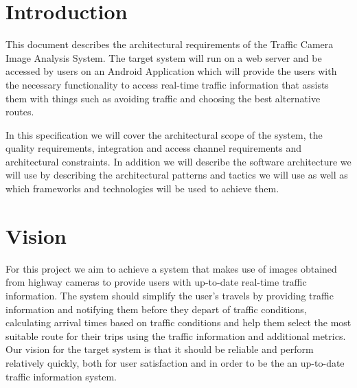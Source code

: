 \documentclass[a4paper,12pt]{article}
\begin{document}
\newpage
\tableofcontents
\newpage

\newpage

\newpage
\section{Introduction}
This document describes the architectural requirements of the Traffic Camera Image Analysis System. The target system will run on a web server  and be accessed by users on an Android Application which will provide the users with the necessary functionality to access real-time traffic information that assists them with things such as avoiding traffic and choosing the best alternative routes.

In this specification we will cover the architectural scope of the system, the quality requirements, integration and access channel requirements and architectural constraints. In addition we will describe the software architecture we will use by describing the architectural patterns and tactics we will use as well as which frameworks and technologies will be used to achieve them.
\section{Vision}
For this project we aim to achieve a system that makes use of images obtained from highway cameras to provide users with up-to-date real-time traffic information. The system should simplify the user's travels by providing traffic information and notifying them before they depart of traffic conditions, calculating arrival times based on traffic conditions and help them select the most suitable route for their trips using the traffic information and additional metrics. Our vision for the target system is that it should be reliable and perform relatively quickly, both for user satisfaction and in order to be the an up-to-date traffic information system.
\end{document}
